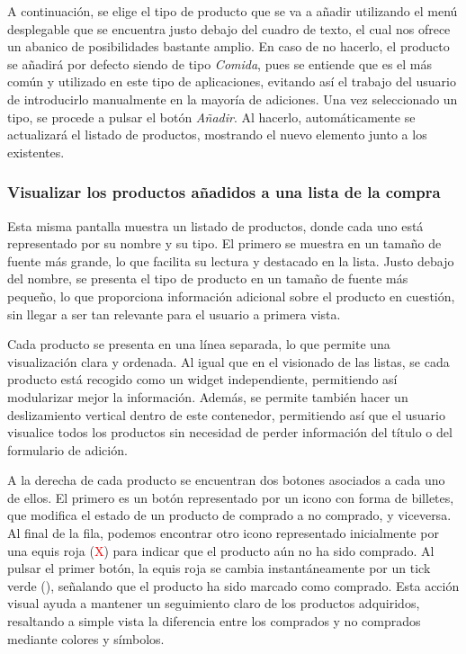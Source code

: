 \documentclass{article}
\begin{document}
A continuación, se elige el tipo de producto que se va a añadir utilizando el menú desplegable que se encuentra justo debajo del cuadro de texto, el cual nos ofrece un abanico de posibilidades bastante amplio. En caso de no hacerlo, el producto se añadirá por defecto siendo de tipo \textit{Comida}, pues se entiende que es el más común y utilizado en este tipo de aplicaciones, evitando así el trabajo del usuario de introducirlo manualmente en la mayoría de adiciones. Una vez seleccionado un tipo, se procede a pulsar el botón \textit{Añadir}. Al hacerlo, automáticamente se actualizará el listado de productos, mostrando el nuevo elemento junto a los existentes.

\subsubsection{Visualizar los productos añadidos a una lista de la compra}

Esta misma pantalla muestra un listado de productos, donde cada uno está representado por su nombre y su tipo. El primero se muestra en un tamaño de fuente más grande, lo que facilita su lectura y destacado en la lista. Justo debajo del nombre, se presenta el tipo de producto en un tamaño de fuente más pequeño, lo que proporciona información adicional sobre el producto en cuestión, sin llegar a ser tan relevante para el usuario a primera vista.

Cada producto se presenta en una línea separada, lo que permite una visualización clara y ordenada. Al igual que en el visionado de las listas, se cada producto está recogido como un widget independiente, permitiendo así modularizar mejor la información. Además, se permite también hacer un deslizamiento vertical dentro de este contenedor, permitiendo así que el usuario visualice todos los productos sin necesidad de perder información del título o del formulario de adición.

A la derecha de cada producto se encuentran dos botones asociados a cada uno de ellos. El primero es un botón representado por un icono con forma de billetes, que modifica el estado de un producto de comprado a no comprado, y viceversa. Al final de la fila, podemos encontrar otro icono representado inicialmente por una equis roja (\textcolor{red}{X}) para indicar que el producto aún no ha sido comprado. Al pulsar el primer botón, la equis roja se cambia instantáneamente por un tick verde (\textcolor{teal}{\checkmark}), señalando que el producto ha sido marcado como comprado. Esta acción visual ayuda a mantener un seguimiento claro de los productos adquiridos, resaltando a simple vista la diferencia entre los comprados y no comprados mediante colores y símbolos.
\end{document}
